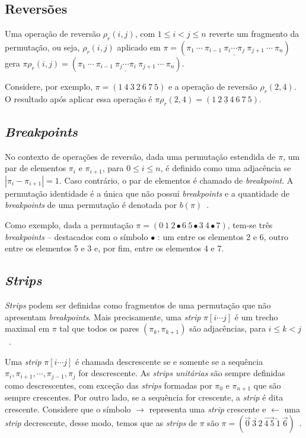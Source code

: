 \documentclass[runningheads,a4paper]{llncs}
\begin{document}
\subsection{Reversões}

Uma operação de reversão $\rho_r(i,j)$, com $1 \leq i < j \leq n$ reverte um fragmento da permutação, ou seja, $\rho_r(i,j)$ aplicado em $\pi=(\pi_1\ \cdots \ \pi_{i-1}\ \underline{\pi_i \cdots \pi_j}\ \pi_{j+1} \ \cdots \ \pi_n)$ gera $\pi \rho_r(i,j) = (\pi_1\ \cdots \ \pi_{i-1}\ \underline{\pi_j \cdots \pi_i}\ \pi_{j+1} \ \cdots \ \pi_n)$.

Considere, por exemplo, $\pi=(1\ 4\ 3\ 2\ 6\ 7\ 5)$ e a operação de reversão $\rho_r(2,4)$. O resultado após aplicar essa operação é $\pi \rho_r(2,4)= (1\ \underline{2\ 3\ 4}\ 6\ 7\ 5)$.

\subsection{\textit{Breakpoints}}
\label{sec:breakpoints}

No contexto de operações de reversão, dada uma permutação estendida de $\pi$, um par de elementos $\pi_i$ e $\pi_{i+1}$, para $0\leq i \leq n$, é definido como uma adjacência se $|\pi_i - \pi_{i+1}| = 1$. Caso contrário, o par de elementos é chamado de \textit{breakpoint}. A permutação identidade é a única que não possui \textit{breakpoints} e a quantidade de \textit{breakpoints} de uma permutação é denotada por $b(\pi)$~\cite{daSilva,Jones}.

Como exemplo, dada a permutação $\pi = (0 \ 1 \ 2 \bullet 6 \ 5 \bullet 3 \ 4 \bullet 7)$, tem-se três \textit{breakpoints} -- destacados com o símbolo $\bullet$ : um entre os elementos 2 e 6, outro entre os elementos 5 e 3 e, por fim, entre os elementos 4 e 7.

\subsection{\textit{Strips}}
\label{sec:strips}

\textit{Strips} podem ser definidas como fragmentos de uma permutação que não apresentam \textit{breakpoints}. Mais precisamente, uma \textit{strip} $\pi[i \cdots j]$ é um trecho maximal em $\pi$ tal que todos os pares $(\pi_k, \pi_{k+1})$ são adjacências, para $i\leq k<j$~\cite{daSilva,Jones}.

Uma \textit{strip} $\pi[i \cdots j]$ é chamada descrescente se e somente se a sequência $\pi_i, \pi_{i+1},\cdots,\pi_{j-1},\pi_j$ for descrescente. As \textit{strips unitárias} são sempre definidas como descrescentes, com exceção das \textit{strips} formadas por $\pi_0$ e $\pi_{n+1}$ que são sempre crescentes. Por outro lado, se a sequência for crescente, a \textit{strip} é dita crescente. Considere que o símbolo $\rightarrow$ representa uma \textit{strip} crescente e $\leftarrow$ uma \textit{strip} decrescente, desse modo, temos que as \textit{strips} de $\pi$ são $\pi = (\overrightarrow{0} \ \overleftarrow{3 \ 2} \ \overrightarrow{4 \ 5} \ \overleftarrow{1} \ \overrightarrow{6})$~\cite{daSilva,Jones}.
\end{document}
